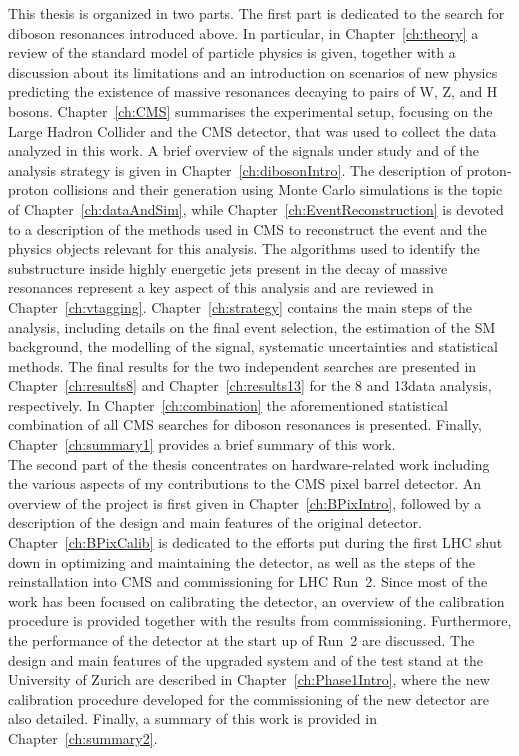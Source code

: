 This thesis is organized in two parts. The first part is dedicated to the search for diboson resonances introduced above. 
In particular, in Chapter~\ref{ch:theory} a review of the standard model of particle physics is given, together with a discussion about its limitations and an introduction on scenarios of new physics predicting the existence of massive resonances decaying to pairs of W, Z, and H bosons.
Chapter~\ref{ch:CMS} summarises the experimental setup, focusing on the Large Hadron Collider and the CMS detector, that was used to collect the data analyzed in this work.
A brief overview of the signals under study and of the analysis strategy is given in Chapter~\ref{ch:dibosonIntro}.
The description of proton-proton collisions and their generation using Monte Carlo simulations is the topic of Chapter~\ref{ch:dataAndSim}, while Chapter~\ref{ch:EventReconstruction} is devoted to a description of the methods used in CMS to reconstruct the event and the physics objects relevant for this analysis. The algorithms used to identify the substructure inside highly energetic jets present in the decay of massive resonances represent a key aspect of this analysis and are reviewed in Chapter~\ref{ch:vtagging}. Chapter~\ref{ch:strategy} contains the main steps of the analysis, including details on the final event selection, the estimation of the SM background, the modelling of the signal, systematic uncertainties and statistical methods. The final results for the two independent searches are presented in Chapter~\ref{ch:results8} and Chapter~\ref{ch:results13} for the 8 and 13\TeV data analysis, respectively.
In Chapter~\ref{ch:combination} the aforementioned statistical combination of all CMS searches for diboson resonances is presented. Finally, Chapter~\ref{ch:summary1} provides a brief summary of this work.\\

The second part of the thesis concentrates on hardware-related work including the various aspects of my contributions to the CMS pixel barrel detector.
An overview of the project is first given in Chapter~\ref{ch:BPixIntro}, followed by a description of the design and main features of the original detector.
Chapter~\ref{ch:BPixCalib} is dedicated to the efforts put during the first LHC shut down in optimizing and maintaining the detector, as well as the steps of the reinstallation into CMS and commissioning for LHC Run~2. Since most of the work has been focused on calibrating the detector, an overview of the calibration procedure is provided together with the results from commissioning. Furthermore, the performance of the detector at the start up of Run~2 are discussed.
The design and main features of the upgraded system and of the test stand at the University of Zurich are described in Chapter~\ref{ch:Phase1Intro}, where the new calibration procedure developed for the commissioning of the new detector are also detailed. Finally, a summary of this work is provided in Chapter~\ref{ch:summary2}.
